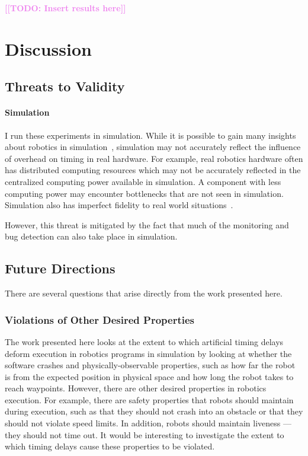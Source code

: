 \documentclass[conference]{IEEEtran}
\newcommand{\todo}[1]{\textcolor{violet}{{\bfseries [[TODO: #1]]}}}
\begin{document}
\todo{Insert results here}

\section{Discussion}

\subsection{Threats to Validity}

\paragraph{Simulation}
I run these experiments in simulation.
While it is possible to gain many insights about robotics in simulation~\cite{TimperleyArdu2018, etc},
simulation may not accurately reflect the influence of overhead on timing
in real hardware.
For example, real robotics hardware often has distributed computing resources
which may not be accurately reflected in the centralized computing power available in simulation.
A component with less computing power may encounter bottlenecks that are not
seen in simulation.
Simulation also has imperfect fidelity to real world situations~\cite{robotSimulationStudy}.

However, this threat is mitigated by the fact that much of the monitoring
and bug detection can also take place in simulation.

\subsection{Future Directions}

There are several questions that arise directly from the work presented here.

\subsubsection{Violations of Other Desired Properties}

The work presented here looks at the extent to which artificial timing delays deform execution
in robotics programs in simulation by looking at whether the software crashes
and physically-observable properties, such as how far the robot is from the expected
position in physical space and how long the robot takes to reach waypoints.
However, there are other desired properties in robotics execution.
For example, there are safety properties that robots should maintain during
execution, such as that they should not crash into an obstacle or that they
should not violate speed limits.
In addition, robots should maintain liveness --- they should not time out.
It would be interesting to investigate the extent to which timing delays cause these properties to be violated.
\end{document}
